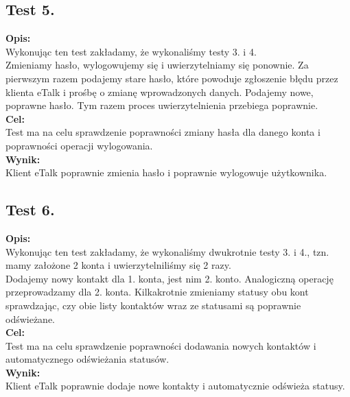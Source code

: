 \documentclass[a4paper,12pt]{article}
\begin{document}
\subsection[Test 5.]{Test 5.}
\textbf{Opis:}\\
Wykonując ten test zakładamy, że wykonaliśmy testy 3. i 4.\\
Zmieniamy hasło, wylogowujemy się i uwierzytelniamy się ponownie. Za pierwszym razem podajemy stare hasło, które powoduje zgłoszenie błędu przez klienta eTalk i prośbę o zmianę wprowadzonych danych. Podajemy nowe, poprawne hasło. Tym razem proces uwierzytelnienia przebiega poprawnie.\\
\textbf{Cel:}\\
Test ma na celu sprawdzenie poprawności zmiany hasła dla danego konta i poprawności operacji wylogowania.\\
\textbf{Wynik:}\\
Klient eTalk poprawnie zmienia hasło i poprawnie wylogowuje użytkownika.

\subsection[Test 6.]{Test 6.}
\textbf{Opis:}\\
Wykonując ten test zakładamy, że wykonaliśmy dwukrotnie testy 3. i 4., tzn. mamy założone 2 konta i uwierzytelniliśmy się 2 razy.\\
Dodajemy nowy kontakt dla 1. konta, jest nim 2. konto. Analogiczną operację przeprowadzamy dla 2. konta.
Kilkakrotnie zmieniamy statusy obu kont sprawdzając, czy obie listy kontaktów wraz ze statusami są poprawnie odświeżane.\\
\textbf{Cel:}\\
Test ma na celu sprawdzenie poprawności dodawania nowych kontaktów i automatycznego odświeżania statusów.\\
\textbf{Wynik:}\\
Klient eTalk poprawnie dodaje nowe kontakty i automatycznie odświeża statusy.
\end{document}
